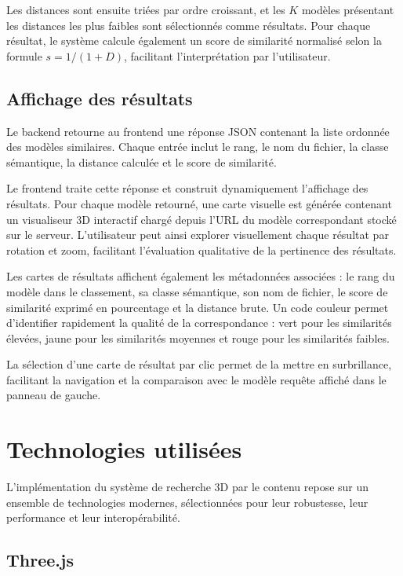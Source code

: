 \documentclass[11pt,a4paper,oneside]{report}
\begin{document}
Les distances sont ensuite triées par ordre croissant, et les $K$ modèles présentant les distances les plus faibles sont sélectionnés comme résultats. Pour chaque résultat, le système calcule également un score de similarité normalisé selon la formule $s = 1/(1 + D)$, facilitant l'interprétation par l'utilisateur.

\subsection{Affichage des résultats}

Le backend retourne au frontend une réponse JSON contenant la liste ordonnée des modèles similaires. Chaque entrée inclut le rang, le nom du fichier, la classe sémantique, la distance calculée et le score de similarité.

Le frontend traite cette réponse et construit dynamiquement l'affichage des résultats. Pour chaque modèle retourné, une carte visuelle est générée contenant un visualiseur 3D interactif chargé depuis l'URL du modèle correspondant stocké sur le serveur. L'utilisateur peut ainsi explorer visuellement chaque résultat par rotation et zoom, facilitant l'évaluation qualitative de la pertinence des résultats.

Les cartes de résultats affichent également les métadonnées associées : le rang du modèle dans le classement, sa classe sémantique, son nom de fichier, le score de similarité exprimé en pourcentage et la distance brute. Un code couleur permet d'identifier rapidement la qualité de la correspondance : vert pour les similarités élevées, jaune pour les similarités moyennes et rouge pour les similarités faibles.

La sélection d'une carte de résultat par clic permet de la mettre en surbrillance, facilitant la navigation et la comparaison avec le modèle requête affiché dans le panneau de gauche.

\section{Technologies utilisées}

L'implémentation du système de recherche 3D par le contenu repose sur un ensemble de technologies modernes, sélectionnées pour leur robustesse, leur performance et leur interopérabilité.

\subsection{Three.js}
\end{document}
